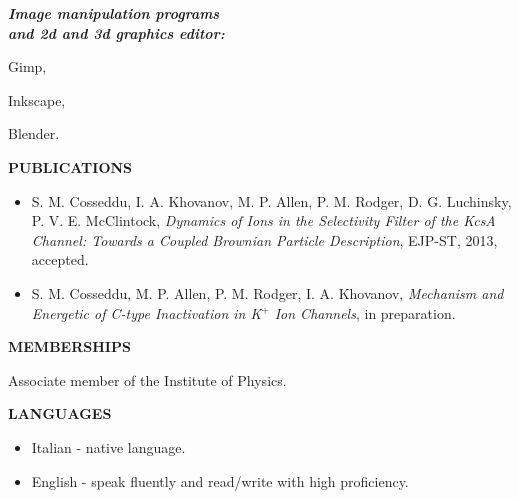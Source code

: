 \documentclass[a4paper,10pt,final]{memoir}
\newcommand{\Sep}{\vspace{1.5em}}
\newcommand{\SmallSep}{\vspace{0.5em}}
\newcommand{\CVSection}[1]
	{\Large\textbf{#1}\par
	\SmallSep\normalsize\normalfont}
\newcommand{\CVItem}[2]
	{\textit{\textbf{\color{RoyalBlue} #1}} #2}
\begin{document}
\begin{multicols}{3}
\CVItem{Image manipulation programs\\ and 2d and 3d graphics editor:\hfill}
\begin{compactitem}[\color{RoyalBlue}$\circ$]
\item Gimp,
\item Inkscape,
\item Blender.
\end{compactitem}

\end{multicols}




\Sep
\CVSection{PUBLICATIONS} 
\begin{itemize} \itemsep -2pt %
\item S. M. Cosseddu, I. A. Khovanov, M. P. Allen, P. M. Rodger, D. G. Luchinsky,
  P. V. E. McClintock, \textit{Dynamics of Ions in the Selectivity Filter of the KcsA Channel: Towards a Coupled
  Brownian Particle Description}, EJP-ST, 2013, accepted.
\item S. M. Cosseddu, M. P. Allen, P. M. Rodger, I. A. Khovanov, \textit{Mechanism and Energetic
  of C-type Inactivation in K$^+$ Ion Channels}, in preparation.
\end{itemize}


\Sep
\CVSection{MEMBERSHIPS} 
Associate member of the Institute of Physics. 

\Sep
\CVSection{LANGUAGES} 
\begin{itemize} \itemsep -2pt %
\item Italian - native language.
\item English - speak fluently and read/write with high proficiency.
\end{itemize}
\end{document}

